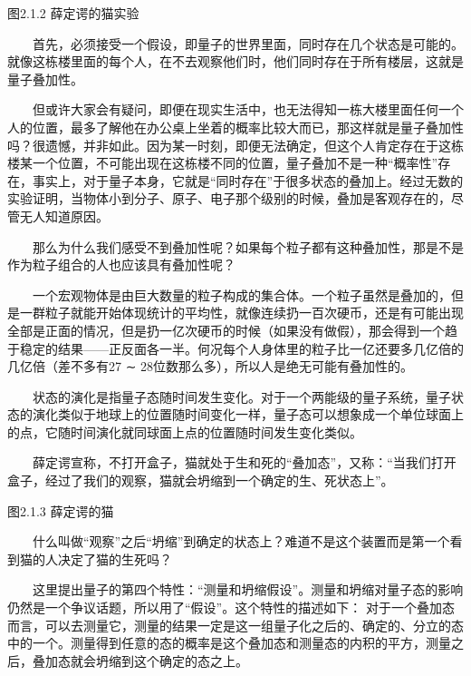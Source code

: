 \documentclass[a4paper,11pt,english]{sphinxmanual}
\begin{document}
\begin{center}图2.1.2 薛定谔的猫实验
\end{center}
\sphinxAtStartPar
  首先，必须接受一个假设，即量子的世界里面，同时存在几个状态是可能的。就像这栋楼里面的每个人，在不去观察他们时，他们同时存在于所有楼层，这就是量子叠加性。

\sphinxAtStartPar
  但或许大家会有疑问，即便在现实生活中，也无法得知一栋大楼里面任何一个人的位置，最多了解他在办公桌上坐着的概率比较大而已，那这样就是量子叠加性吗？很遗憾，并非如此。因为某一时刻，即便无法确定，但这个人肯定存在于这栋楼某一个位置，不可能出现在这栋楼不同的位置，量子叠加不是一种“概率性”存在，事实上，对于量子本身，它就是“同时存在”于很多状态的叠加上。经过无数的实验证明，当物体小到分子、原子、电子那个级别的时候，叠加是客观存在的，尽管无人知道原因。

\sphinxAtStartPar
  那么为什么我们感受不到叠加性呢？如果每个粒子都有这种叠加性，那是不是作为粒子组合的人也应该具有叠加性呢？

\sphinxAtStartPar
  一个宏观物体是由巨大数量的粒子构成的集合体。一个粒子虽然是叠加的，但是一群粒子就能开始体现统计的平均性，就像连续扔一百次硬币，还是有可能出现全部是正面的情况，但是扔一亿次硬币的时候（如果没有做假），那会得到一个趋于稳定的结果——正反面各一半。何况每个人身体里的粒子比一亿还要多几亿倍的几亿倍（差不多有27 ∼ 28位数那么多），所以人是绝无可能有叠加性的。

\sphinxAtStartPar
{}

\sphinxAtStartPar
  状态的演化是指量子态随时间发生变化。对于一个两能级的量子系统，量子状态的演化类似于地球上的位置随时间变化一样，量子态可以想象成一个单位球面上的点，它随时间演化就同球面上点的位置随时间发生变化类似。

\sphinxAtStartPar
{}

\sphinxAtStartPar
  薛定谔宣称，不打开盒子，猫就处于生和死的“叠加态”，又称：“当我们打开盒子，经过了我们的观察，猫就会坍缩到一个确定的生、死状态上”。


\begin{center}图2.1.3 薛定谔的猫
\end{center}
\sphinxAtStartPar
  什么叫做“观察”之后“坍缩”到确定的状态上？难道不是这个装置而是第一个看到猫的人决定了猫的生死吗？

\sphinxAtStartPar
  这里提出量子的第四个特性：“测量和坍缩假设”。测量和坍缩对量子态的影响仍然是一个争议话题，所以用了“假设”。这个特性的描述如下：
对于一个叠加态而言，可以去测量它，测量的结果一定是这一组量子化之后的、确定的、分立的态中的一个。测量得到任意的态的概率是这个叠加态和测量态的内积的平方，测量之后，叠加态就会坍缩到这个确定的态之上。
\end{document}
